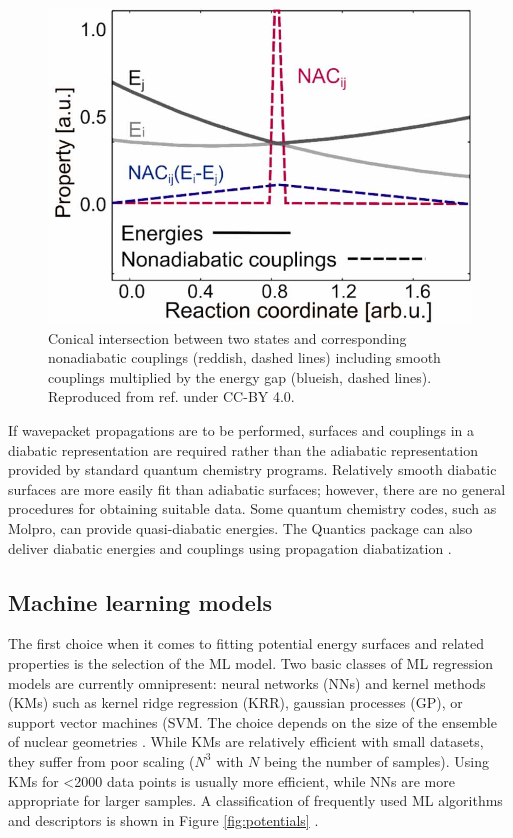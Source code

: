 \documentclass[9pt,bestpractices]{livecoms}
\begin{document}
\begin{figure}[hbt!]
\includegraphics[width=\linewidth]{figures/Couplings_JW2020b.jpg}
\caption{Conical intersection between two states and corresponding nonadiabatic couplings (reddish, dashed lines) including smooth couplings multiplied by the energy gap (blueish, dashed lines). Reproduced from ref. \cite{RN102} under CC-BY 4.0.}
\label{fig:couplings}
\end{figure}

If wavepacket propagations are to be performed, surfaces and couplings in a diabatic representation are required rather than the adiabatic representation provided by standard quantum chemistry programs. Relatively smooth diabatic surfaces are more easily fit than adiabatic surfaces; however, there are no general procedures for obtaining suitable data.  Some quantum chemistry codes, such as Molpro, can provide quasi-diabatic energies. The Quantics package can also deliver diabatic energies and couplings using propagation diabatization \cite{RN40}.

\subsection{Machine learning models}

The first choice when it comes to fitting potential energy surfaces and related properties is the selection of the ML model. Two basic classes of ML regression models are currently omnipresent: neural networks (NNs) and kernel methods (KMs) such as kernel ridge regression (KRR), gaussian processes (GP), or support vector machines (SVM. The choice depends on the size of the ensemble of nuclear geometries \cite{RN102, RN39}. While KMs are relatively efficient with small datasets, they suffer from poor scaling ($N^3$ with $N$ being the number of samples). Using KMs for <2000 data points is usually more efficient, while NNs are more appropriate for larger samples. A classification of frequently used ML algorithms and descriptors is shown in Figure \ref{fig:potentials} \cite{RN39}.
\end{document}
